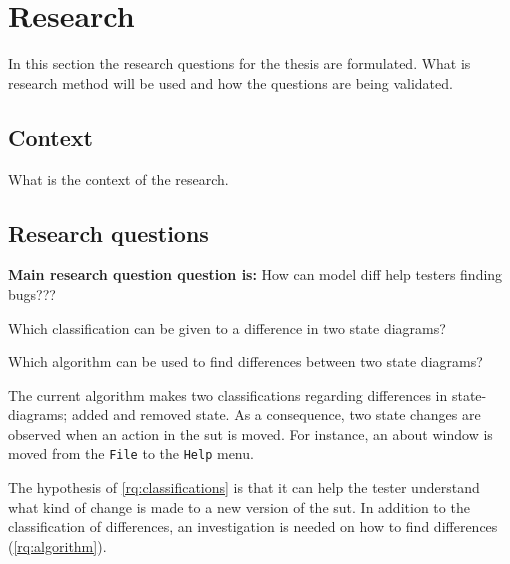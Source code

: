 \section{Research} \label{questions}
    In this section the research questions for the thesis are formulated. What is research method will be used and how the questions are being validated.

    \subsection{Context}
    What is the context of the research. 

    \subsection{Research questions}
        
        \textbf{Main research question question is:} How can model diff help testers finding bugs???
        
        
        \begin{questions}
            \item Which classification can be given to a difference in two state diagrams? \label{rq:classifications} 
            \begin{questions}
                \item Which algorithm can be used to find differences between two state diagrams? \label{rq:algorithm}    
            \end{questions}
        \end{questions}
        
        The current algorithm \cite{stateDiff} makes two classifications regarding differences in state-diagrams; added and removed state. As a consequence, two state changes are observed when an action in the \acrshort{sut} is moved. For instance, an about window is moved from the \verb|File| to the \verb|Help| menu. 
        
        The hypothesis of \ref{rq:classifications} is that it can help the tester understand what kind of change is made to a new version of the \acrshort{sut}. In addition to the classification of differences, an investigation is needed on how to find differences (\ref{rq:algorithm}).
        
